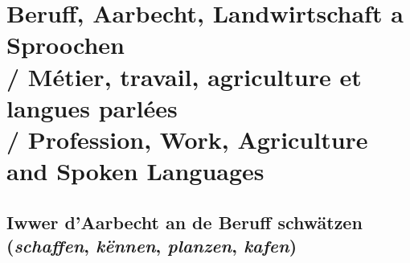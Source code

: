 \vspace{1.5em}

\section[Beruff, Aarbecht, Landwirtschaft a Sproochen]{Beruff, Aarbecht, Landwirtschaft a Sproochen \\/ Métier, travail, agriculture et langues parlées \\/ Profession, Work, Agriculture and Spoken Languages}

\subsection{Iwwer d'Aarbecht an de Beruff schwätzen (\textit{schaffen}, \textit{kënnen}, \textit{planzen}, \textit{kafen})}

